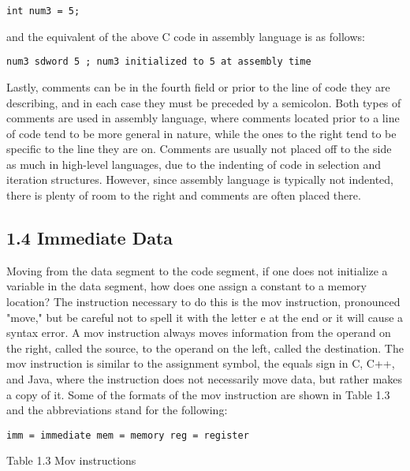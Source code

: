 \documentclass[10pt]{article}
\begin{document}
\begin{verbatim}
int num3 = 5;
\end{verbatim}

and the equivalent of the above C code in assembly language is as follows:

\begin{verbatim}
num3 sdword 5 ; num3 initialized to 5 at assembly time
\end{verbatim}

Lastly, comments can be in the fourth field or prior to the line of code they are describing, and in each case they must be preceded by a semicolon. Both types of comments are used in assembly language, where comments located prior to a line of code tend to be more general in nature, while the ones to the right tend to be specific to the line they are on. Comments are usually not placed off to the side as much in high-level languages, due to the indenting of code in selection and iteration structures. However, since assembly language is typically not indented, there is plenty of room to the right and comments are often placed there.

\subsection*{1.4 Immediate Data}
Moving from the data segment to the code segment, if one does not initialize a variable in the data segment, how does one assign a constant to a memory location? The instruction necessary to do this is the mov instruction, pronounced "move," but be careful not to spell it with the letter e at the end or it will cause a syntax error. A mov instruction always moves information from the operand on the right, called the source, to the operand on the left, called the destination. The mov instruction is similar to the assignment symbol, the equals sign in C, C++, and Java, where the instruction does not necessarily move data, but rather makes a copy of it. Some of the formats of the mov instruction are shown in Table 1.3 and the abbreviations stand for the following:

\begin{verbatim}
imm = immediate mem = memory reg = register
\end{verbatim}

Table 1.3 Mov instructions
\end{document}

